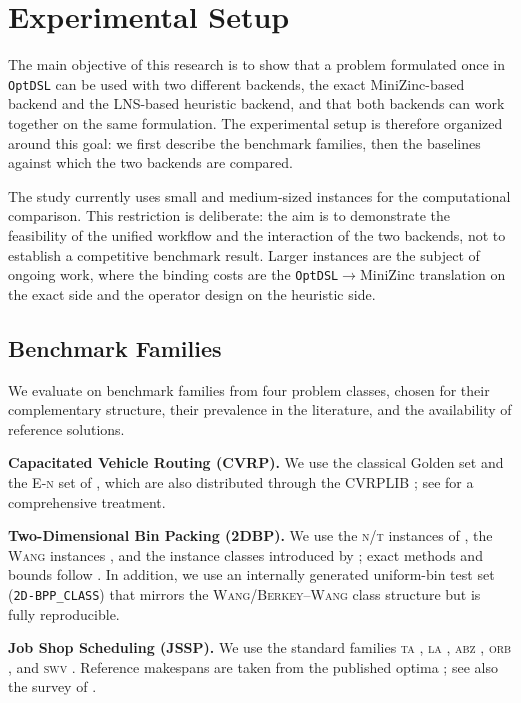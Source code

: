 \documentclass[11pt,a4paper]{article}
\begin{document}
\section{Experimental Setup}
The main objective of this research is to show that a problem formulated once in \texttt{OptDSL} can be used with two different backends, the exact MiniZinc-based backend and the LNS-based heuristic backend, and that both backends can work together on the same formulation.
The experimental setup is therefore organized around this goal: we first describe the benchmark families, then the baselines against which the two backends are compared.

The study currently uses small and medium-sized instances for the computational
comparison.
This restriction is deliberate: the aim is to demonstrate the feasibility of the unified workflow and the interaction of the two backends, not to establish a competitive benchmark result.
Larger instances are the subject of ongoing work, where the binding costs are the \texttt{OptDSL}$\to$MiniZinc translation on the exact side and the operator design on the heuristic side.

\subsection{Benchmark Families}
We evaluate on benchmark families from four problem classes, chosen for their complementary structure, their prevalence in the literature, and the availability of reference solutions.

\textbf{Capacitated Vehicle Routing (CVRP).}
We use the classical Golden set \citep{christofides1979,golden1998} and the \textsc{E-n} set of \citet{christofides1969}, which are also distributed through the CVRPLIB \citep{uchoa2017cvrplib}; see \citet{toth2014vrp} for a comprehensive treatment.

\textbf{Two-Dimensional Bin Packing (2DBP).}
We use the \textsc{n/t} instances of \citet{hopper2001genetic,hopper2001ejor}, the \textsc{Wang} instances \citep{wang1983}, and the instance classes introduced by \citet{berkey1987}; exact methods and bounds follow \citet{lodi2002twodimensional,martello1998exact}.
In addition, we use an internally generated uniform-bin test set (\texttt{2D-BPP\_CLASS}) that mirrors the \textsc{Wang}/\textsc{Berkey--Wang} class structure but is fully reproducible.

\textbf{Job Shop Scheduling (JSSP).}
We use the standard families \textsc{ta} \citep{taillard1993benchmarks}, \textsc{la} \citep{lawrence1984}, \textsc{abz} \citep{adams1988shifting}, \textsc{orb} \citep{applegate1991}, and \textsc{swv} \citep{storer1992}.
Reference makespans are taken from the published optima \citep{applegate1991,nowicki1996fast,taillard1993benchmarks}; see also the survey of \citet{jain1999jssp}.
\end{document}
